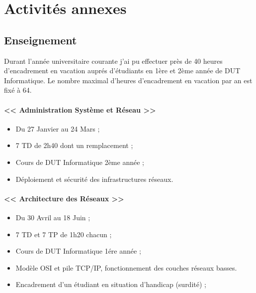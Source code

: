 \section{Activités annexes}
\label{sec:other}
  \subsection{Enseignement}

    Durant l'année universitaire courante j'ai pu effectuer près de 40 heures
    d'encadrement en vacation auprés d'étudiants en 1ère et 2ème année de DUT
    Informatique. Le nombre maximal d'heures d'encadrement en vacation par an
    est fixé à 64.


    \paragraph{<< Administration Système et Réseau >>}
    { \begin{itemize}
        \item Du 27 Janvier au 24 Mars ;
        \item 7 TD de 2h40 dont un remplacement ;
        \item Cours de DUT Informatique 2ème année ;
        \item Déploiement et sécurité des infrastructures réseaux. 
      \end{itemize} }

    \paragraph{<< Architecture des Réseaux >>}
    { \begin{itemize}
        \item Du 30 Avril au 18 Juin ;
        \item 7 TD et 7 TP de 1h20 chacun ;
        \item Cours de DUT Informatique 1ére année ;
        \item Modèle OSI et pile TCP/IP, fonctionnement des couches réseaux basses.
        \item Encadrement d'un étudiant en situation d'handicap (surdité) ;
      \end{itemize} }
    
